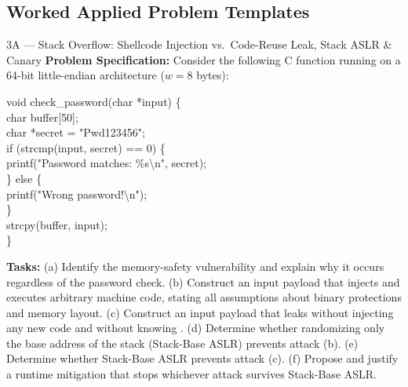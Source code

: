 \subsection{Worked Applied Problem Templates}

\begin{templatebox}{3A --- Stack Overflow: Shellcode Injection vs.\ Code-Reuse Leak, Stack ASLR \& Canary}
\textbf{Problem Specification:} Consider the following C function running on a 64-bit little-endian architecture ($w = 8$ bytes):
\begin{codeblock}
void check\_password(char *input) \{\\
\hspace*{1.5em} char buffer[50];\\
\hspace*{1.5em} char *secret = "Pwd123456";\\
\hspace*{1.5em} if (strcmp(input, secret) == 0) \{\\
\hspace*{3.0em} printf("Password matches: \%s\textbackslash n", secret);\\
\hspace*{1.5em} \} else \{\\
\hspace*{3.0em} printf("Wrong password!\textbackslash n");\\
\hspace*{1.5em} \}\\
\hspace*{1.5em} strcpy(buffer, input);\\
\}
\end{codeblock}
\textbf{Tasks:} (a) Identify the memory-safety vulnerability and explain why it occurs regardless of the password check. (b) Construct an input payload that injects and executes arbitrary machine code, stating all assumptions about binary protections and memory layout. (c) Construct an input payload that leaks  without injecting any new code and without knowing . (d) Determine whether randomizing only the base address of the stack (Stack-Base ASLR) prevents attack (b). (e) Determine whether Stack-Base ASLR prevents attack (c). (f) Propose and justify a runtime mitigation that stops whichever attack survives Stack-Base ASLR.


\end{templatebox}

